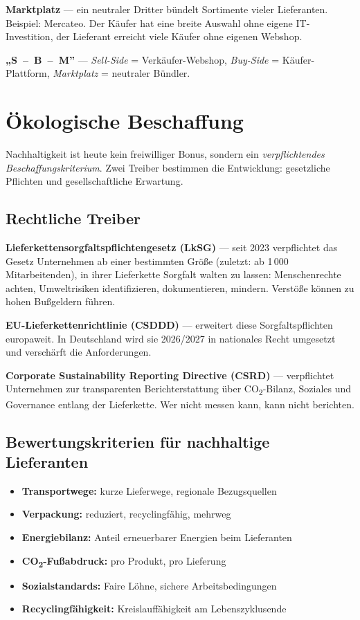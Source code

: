 \documentclass[11pt, a4paper]{article}
\begin{document}
\textbf{Marktplatz} --- ein neutraler Dritter bündelt Sortimente vieler Lieferanten.
Beispiel: Mercateo. Der Käufer hat eine breite Auswahl ohne eigene IT-Investition,
der Lieferant erreicht viele Käufer ohne eigenen Webshop.

\begin{eselsbruecke}
\textbf{„S~--~B~--~M”} --- \emph{Sell-Side} = Verkäufer-Webshop, \emph{Buy-Side} =
Käufer-Plattform, \emph{Marktplatz} = neutraler Bündler.
\end{eselsbruecke}

\section{Ökologische Beschaffung}

Nachhaltigkeit ist heute kein freiwilliger Bonus, sondern ein \emph{verpflichtendes
Beschaffungs­kriterium}. Zwei Treiber bestimmen die Entwicklung: gesetzliche Pflichten
und gesellschaftliche Erwartung.

\subsection{Rechtliche Treiber}

\textbf{Lieferketten­sorgfalts­pflichten­gesetz (LkSG)} --- seit 2023 verpflichtet das
Gesetz Unternehmen ab einer bestimmten Größe (zuletzt: ab 1\,000 Mitarbeitenden), in
ihrer Lieferkette Sorgfalt walten zu lassen: Menschenrechte achten, Umweltrisiken
identifizieren, dokumentieren, mindern. Verstöße können zu hohen Bußgeldern führen.

\textbf{EU-Lieferketten­richtlinie (CSDDD)} --- erweitert diese Sorgfaltspflichten
europaweit. In Deutschland wird sie 2026/2027 in nationales Recht umgesetzt und
verschärft die Anforderungen.

\textbf{Corporate Sustainability Reporting Directive (CSRD)} --- verpflichtet
Unternehmen zur transparenten Berichterstattung über CO\textsubscript{2}-Bilanz,
Soziales und Governance entlang der Lieferkette. Wer nicht messen kann, kann nicht
berichten.

\subsection{Bewertungs­kriterien für nachhaltige Lieferanten}

\begin{itemize}[itemsep=0pt]
  \item \textbf{Transportwege:} kurze Lieferwege, regionale Bezugsquellen
  \item \textbf{Verpackung:} reduziert, recyclingfähig, mehrweg
  \item \textbf{Energie­bilanz:} Anteil erneuerbarer Energien beim Lieferanten
  \item \textbf{CO\textsubscript{2}-Fußabdruck:} pro Produkt, pro Lieferung
  \item \textbf{Sozial­standards:} Faire Löhne, sichere Arbeitsbedingungen
  \item \textbf{Recyclingfähigkeit:} Kreislauffähigkeit am Lebenszyklusende
\end{itemize}
\end{document}
